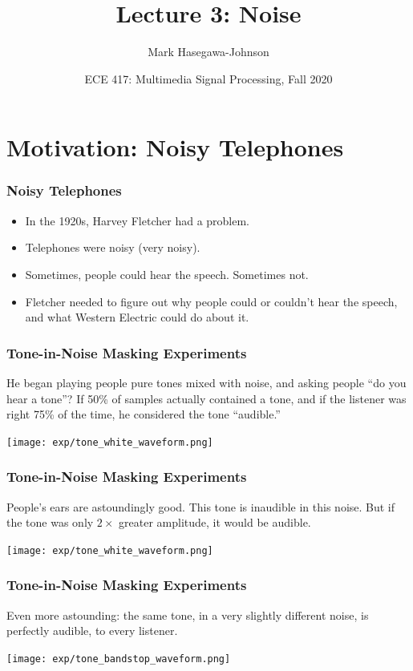 \documentclass{beamer}
\title{Lecture 3: Noise}
\author{Mark Hasegawa-Johnson}
\date{ECE 417: Multimedia Signal Processing, Fall 2020}
\begin{document}
\begin{frame}
  \maketitle
\end{frame}

\begin{frame}
  \tableofcontents
\end{frame}

\section[Motivation]{Motivation: Noisy Telephones}
\setcounter{subsection}{1}

\begin{frame}
  \frametitle{Noisy Telephones}
  \begin{itemize}
  \item In the 1920s, Harvey Fletcher had a problem.
  \item Telephones were noisy (very noisy).
  \item Sometimes, people could hear the speech.  Sometimes not.
  \item Fletcher needed to figure out why people could or couldn't hear the
    speech, and what Western Electric could do about  it.
  \end{itemize}
\end{frame}

\begin{frame}
  \frametitle{Tone-in-Noise Masking Experiments}

  He began playing people pure tones mixed with noise, and asking
  people ``do you hear a tone''?  If 50\% of samples actually
  contained a tone, and if the listener was right 75\% of the time, he
  considered the tone ``audible.''
  \centerline{\texttt{[image: exp/tone\_white\_waveform.png]}}
\end{frame}

\begin{frame}
  \frametitle{Tone-in-Noise Masking Experiments}

  People's ears are astoundingly good.  This tone is inaudible in this
  noise.  But if the tone was only $2\times$ greater amplitude, it
  would be audible.
  \centerline{\texttt{[image: exp/tone\_white\_waveform.png]}}
\end{frame}

\begin{frame}
  \frametitle{Tone-in-Noise Masking Experiments}

  Even more astounding: the same tone, in a very slightly different noise,
  is perfectly audible, to every listener.
  \centerline{\texttt{[image: exp/tone\_bandstop\_waveform.png]}}
\end{frame}
\end{document}
